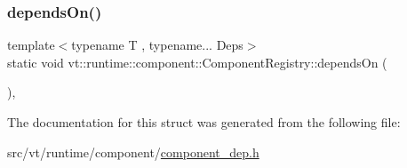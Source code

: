 \mbox{\label{structvt_1_1runtime_1_1component_1_1_component_registry_ae8a95527cfaa6e82f5f446d346aa8234}} 
\subsubsection{\texorpdfstring{depends\+On()}{dependsOn()}}
{\footnotesize\ttfamily template$<$typename T , typename... Deps$>$ \\
static void vt\+::runtime\+::component\+::\+Component\+Registry\+::depends\+On (\begin{DoxyParamCaption}{ }\end{DoxyParamCaption})\hspace{0.3cm}{\ttfamily [inline]}, {\ttfamily [static]}}



The documentation for this struct was generated from the following file\+:\begin{DoxyCompactItemize}
\item 
src/vt/runtime/component/\hyperlink{component__dep_8h}{component\+\_\+dep.\+h}\end{DoxyCompactItemize}
